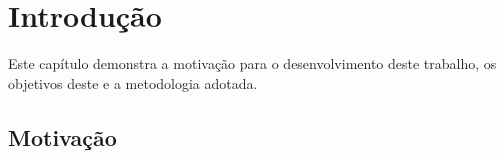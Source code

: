 \chapter[Introdução]{Introdução}


Este capítulo demonstra a motivação para o desenvolvimento deste trabalho, os objetivos deste e a metodologia adotada.

\section{Motivação} %







